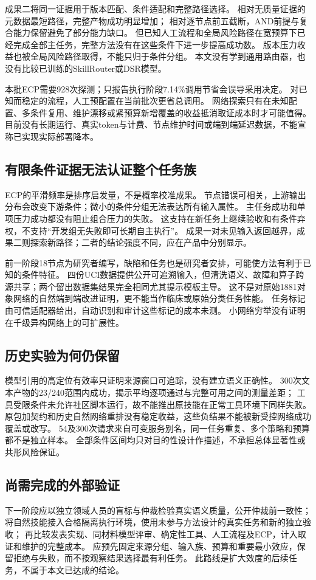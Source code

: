 成果二将同一证据用于版本匹配、条件适配和完整路径选择。
相对无质量证据的元数据最短路径，完整产物成功明显增加；
相对逐节点前五截断，AND前提与复合能力保留避免了部分能力缺口。
但已知人工流程和全局风险路径在宽预算下已经完成全部主任务，完整方法没有在这些条件下进一步提高成功数。
版本压力收益也被全局风险路径取得，不能只归于条件分组。
本文没有学到通用路由器，也没有比较已训练的SkillRouter或DSR模型。

本批ECP需要928次探测；只报告执行阶段7.14\%调用节省会误导采用决定。
对已知而稳定的流程，人工预配置在当前批次更省总调用。
网络探索只有在未知配置、多条件复用、维护漂移或紧预算新增覆盖的收益抵消取证成本时才可能值得。
目前没有长期运行、真实token与计费、节点维护时间或端到端延迟数据，不能宣称已实现实际部署降本。

\subsection{有限条件证据无法认证整个任务族}
ECP的平滑频率是排序启发量，不是概率校准成果。
节点错误可相关，上游输出分布会改变下游条件；微小的条件分组无法表达所有输入属性。
主任务成功和单项压力成功都没有阻止组合压力的失败。
这支持在新任务上继续验收和有条件弃权，不支持“开发组无失败即可长期自主执行”。
成果一对未见输入返回越界，成果二则探索新路径；二者的结论强度不同，应在产品中分别显示。

前一阶段18节点为研究者编写，缺陷和任务也是研究者安排，可能使方法有利于已知的条件特征。
四份UCI数据提供公开可追溯输入，但清洗语义、故障和算子跨源共享；两个留出数据集结果完全相同尤其提示模板主导。
这不是对原始1881对象网络的自然端到端改进证明，更不能当作临床或原始分类任务性能。
任务标记由可信适配器给出，自动识别和审计这些标记的成本未测。
小网络穷举没有证明在千级异构网络上的可扩展性。

\subsection{历史实验为何仍保留}
模型引用的高定位有效率只证明来源窗口可追踪，没有建立语义正确性。
300次文本产物的23/240范围内成功，揭示平均逐项通过与完整可用之间的测量差距；
工具受限条件未允许社区脚本运行，故不能推出原技能在正常工具环境下同样失败。
原包加契约和历史自然网络重排没有稳定收益，这些负结果不能被新受控网络成功覆盖或改写。
54及300次请求来自可变服务别名，同一任务重复、多个策略和预算都不是独立样本。
全部条件区间均只对目的性设计作描述，不承担总体显著性或共形风险保证。

\subsection{尚需完成的外部验证}
下一阶段应以独立领域人员的盲标与仲裁检验真实语义质量，公开仲裁前一致性；
将自然技能接入合格隔离执行环境，使用未参与方法设计的真实任务和新的独立验收；
再比较发表实现、同材料模型评审、确定性工具、人工流程及ECP，计入取证和维护的完整成本。
应预先固定来源分组、输入族、预算和重要最小效应，保留拒绝与失败，而不按观察结果选择最有利任务。
此路线是扩大效度的后续任务，不属于本文已达成的结论。
